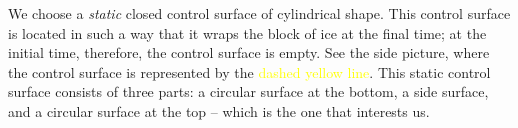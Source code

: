 \documentclass[a4paper,12pt,%
onecolumn,oneside,titlepage,%
british%
]{memoir}
\renewcommand*{\|}[1][]{\nonscript\:#1\vert\nonscript\:\mathopen{}}
\begin{document}
We choose a \emph{static} closed control surface of cylindrical shape.
%
This control surface is located in such a way that it wraps the block of ice at the final time; at the initial time, therefore, the control surface is empty. See the side picture, where the control surface is represented by the \textcolor{yellow}{dashed yellow line}. This static control surface consists of three parts: a circular surface at the bottom, a side surface, and a circular surface at the top -- which is the one that interests us.
\end{document}
